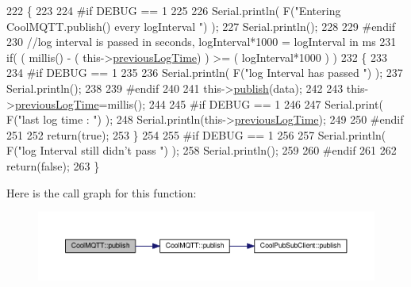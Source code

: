 \begin{DoxyCode}
222 \{
223 
224 \textcolor{preprocessor}{#if DEBUG == 1 }
225 
226     Serial.println( F(\textcolor{stringliteral}{"Entering CoolMQTT.publish() every logInterval "}) );
227     Serial.println();
228 
229 \textcolor{preprocessor}{#endif }
230     \textcolor{comment}{//log interval is passed in seconds, logInterval*1000 = logInterval in ms}
231     \textcolor{keywordflow}{if}( ( millis() - ( this->\hyperlink{class_cool_m_q_t_t_a3db37ef9ed3b05b2a8d44edba0e7d3cc}{previousLogTime})  ) >= ( logInterval*1000 ) )
232     \{
233     
234 \textcolor{preprocessor}{    #if DEBUG == 1}
235 
236         Serial.println( F(\textcolor{stringliteral}{"log Interval has passed "}) );
237         Serial.println();
238     
239 \textcolor{preprocessor}{    #endif}
240 
241         this->\hyperlink{class_cool_m_q_t_t_ace977b3e90ab14b1199fe5c4fb0a13ec}{publish}(data);
242 
243         this->\hyperlink{class_cool_m_q_t_t_a3db37ef9ed3b05b2a8d44edba0e7d3cc}{previousLogTime}=millis();
244     
245 \textcolor{preprocessor}{    #if DEBUG == 1 }
246 
247         Serial.print( F(\textcolor{stringliteral}{"last log time : "}) );
248         Serial.println(this->\hyperlink{class_cool_m_q_t_t_a3db37ef9ed3b05b2a8d44edba0e7d3cc}{previousLogTime});
249 
250 \textcolor{preprocessor}{    #endif}
251 
252         \textcolor{keywordflow}{return}(\textcolor{keyword}{true});
253     \}
254 
255 \textcolor{preprocessor}{#if DEBUG == 1 }
256 
257     Serial.println( F(\textcolor{stringliteral}{"log Interval still didn't pass "}) ); 
258     Serial.println();
259 
260 \textcolor{preprocessor}{#endif}
261 
262     \textcolor{keywordflow}{return}(\textcolor{keyword}{false});
263 \}
\end{DoxyCode}
Here is the call graph for this function\+:\nopagebreak
\begin{figure}[H]
\begin{center}
\leavevmode
\includegraphics[width=350pt]{d0/dd0/class_cool_m_q_t_t_a613c5e3927ae85bb94fbf648d84d8780_cgraph}
\end{center}
\end{figure}
\mbox{\label{class_cool_m_q_t_t_ae3c18f6ae9723746d32765f1c8f176ca}} 
